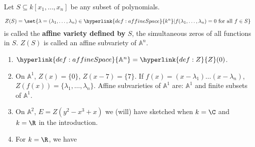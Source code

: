 \documentclass{article}
\newcommand{\A}{\mathbb{A}}
\begin{document}
Let $S \subseteq k[x_1, \dotsc, x_n]$ be any subset of polynomials.
\begin{defi}
    \begin{equation*}
        Z(S) = \set{\lambda = (\lambda_1, \dotsc, \lambda_n) \in \hyperlink{def:affineSpace}{k^n} | f(\lambda_1, \dotsc, \lambda_n) = 0 \text{ for all } f \in S}
    \end{equation*}
    is called the \textbf{affine variety defined by} $S$, the simultaneous zeros of all functions in $S$.
    $Z(S)$ is called an affine subvariety of $\A^n$.
\end{defi}

\begin{eg}
    \leavevmode
    \begin{enumerate}[label=(\roman*)]
        \item $\hyperlink{def:affineSpace}{\A^n} = \hyperlink{def:Z}{Z}(0)$.
        \item On $\A^1$, $Z(x) = \{0\}$, $Z(x-7) = \{7\}$.  If $f(x) = (x - \lambda_1)\dotsc (x-\lambda_n)$, $Z(f(x)) = \{\lambda_1, \dotsc, \lambda_n\}$.
            Affine subvarieties of $\A^1$ are: $\A^1$ and finite subsets of $\A^1$.
        \item On $\A^2$, $E=Z(y^2-x^3+x)$ we (will) have sketched when $k=\C$ and $k=\R$ in the introduction.
        \item For $k=\R$, we have
            \begin{figure}[!h]
                \centering
            \end{figure}
    \end{enumerate}
\end{eg}
\end{document}
